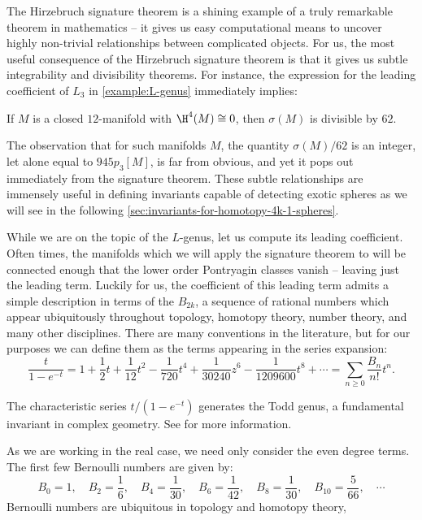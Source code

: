 The Hirzebruch signature theorem is a shining example of a truly remarkable theorem in mathematics -- it gives us easy computational means to uncover highly non-trivial relationships between complicated objects. For us, the most useful consequence of the Hirzebruch signature theorem is that it gives us subtle integrability and divisibility theorems. For instance, the expression for the leading coefficient of $L_3$ in \cref{example:L-genus} immediately implies:
\begin{corollary}
	If $M$ is a closed $12$-manifold with $\H^4(M)\cong 0$, then $\sigma(M)$ is divisible by $62$.
\end{corollary}
The observation that for such manifolds $M$, the quantity $\sigma(M)/62$ is an integer, let alone equal to $945p_3[M]$, is far from obvious, and yet it pops out immediately from the signature theorem. These subtle relationships are immensely useful in defining invariants capable of detecting exotic spheres as we will see in the following \cref{sec:invariants-for-homotopy-4k-1-spheres}.

While we are on the topic of the $L$-genus, let us compute its leading coefficient. Often times, the manifolds which we will apply the signature theorem to will be connected enough that the lower order Pontryagin classes vanish -- leaving just the leading term.
Luckily for us, the coefficient of this leading term admits a simple description in terms of the  $B_{2k}$, a sequence of rational numbers which appear ubiquitously throughout topology, homotopy theory, number theory, and many other disciplines. There are many conventions in the literature, but for our purposes we can define them as the terms appearing in the series expansion:
\[
	\frac{t}{1-e^{-t}} =  1+\frac{1}{2}t + \frac{1}{12}t^2-\frac{1}{720}t^4+\frac{1}{30240}z^6-\frac{1}{1209600}t^8+\cdots=\sum_{n\geq 0}\frac{B_n}{n!}t^n.
\]
\begin{remark}
	The characteristic series $t/(1-e^{-t})$ generates the Todd genus, a fundamental invariant in complex geometry. See  for more information.
\end{remark}
As we are working in the real case, we need only consider the even degree terms. The first few Bernoulli numbers are given by:
\begin{equation}\label{eq:bernoulli_numbers}
	B_0 = 1,\quad B_2 = \frac{1}{6},\quad B_4 = \frac{1}{30},\quad B_6=\frac{1}{42},\quad B_{8}=\frac{1}{30},\quad B_{10} = \frac{5}{66},\quad\cdots
\end{equation}
Bernoulli numbers are ubiquitous in topology and homotopy theory, 

